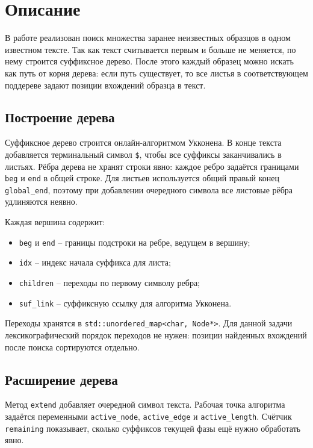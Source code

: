 \section{Описание}

В работе реализован поиск множества заранее неизвестных образцов в одном известном тексте. Так как
текст считывается первым и больше не меняется, по нему строится суффиксное дерево. После этого каждый
образец можно искать как путь от корня дерева: если путь существует, то все листья в соответствующем
поддереве задают позиции вхождений образца в текст.

\subsection{Построение дерева}

Суффиксное дерево строится онлайн-алгоритмом Укконена. В конце текста
добавляется терминальный символ \texttt{\$}, чтобы все суффиксы заканчивались в листьях. Рёбра дерева
не хранят строки явно: каждое ребро задаётся границами \texttt{beg} и \texttt{end} в общей строке.
Для листьев используется общий правый конец \texttt{global\_end}, поэтому при добавлении очередного
символа все листовые рёбра удлиняются неявно.

Каждая вершина содержит:
\begin{itemize}
\item \texttt{beg} и \texttt{end} -- границы подстроки на ребре, ведущем в вершину;
\item \texttt{idx} -- индекс начала суффикса для листа;
\item \texttt{children} -- переходы по первому символу ребра;
\item \texttt{suf\_link} -- суффиксную ссылку для алгоритма Укконена.
\end{itemize}

Переходы хранятся в \texttt{std::unordered\_map<char, Node*>}. Для данной задачи лексикографический
порядок переходов не нужен: позиции найденных вхождений после поиска сортируются отдельно.

\subsection{Расширение дерева}

Метод \texttt{extend} добавляет очередной символ текста. Рабочая точка алгоритма задаётся переменными
\texttt{active\_node}, \texttt{active\_edge} и \texttt{active\_length}. Счётчик \texttt{remaining}
показывает, сколько суффиксов текущей фазы ещё нужно обработать явно.

